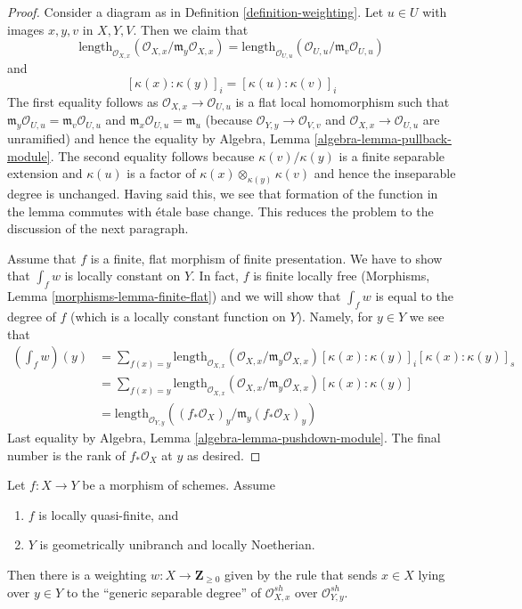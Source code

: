 \begin{proof}
Consider a diagram as in Definition \ref{definition-weighting}.
Let $u \in U$ with images $x, y, v$ in $X, Y, V$. Then we claim that
$$
\text{length}_{\mathcal{O}_{X, x}}
(\mathcal{O}_{X, x}/\mathfrak m_y \mathcal{O}_{X, x}) =
\text{length}_{\mathcal{O}_{U, u}}
(\mathcal{O}_{U, u}/\mathfrak m_v \mathcal{O}_{U, u})
$$
and
$$
[\kappa(x) : \kappa(y)]_i =
[\kappa(u) : \kappa(v)]_i
$$
The first equality follows as $\mathcal{O}_{X, x} \to \mathcal{O}_{U, u}$
is a flat local homomorphism such that
$\mathfrak m_y \mathcal{O}_{U, u} = \mathfrak m_v \mathcal{O}_{U, u}$
and $\mathfrak m_x \mathcal{O}_{U, u} = \mathfrak m_u$
(because $\mathcal{O}_{Y, y} \to \mathcal{O}_{V, v}$ and
$\mathcal{O}_{X, x} \to \mathcal{O}_{U, u}$ are unramified)
and hence the equality by Algebra, Lemma \ref{algebra-lemma-pullback-module}.
The second equality follows because $\kappa(v)/\kappa(y)$ is a finite
separable extension and $\kappa(u)$ is a factor of
$\kappa(x) \otimes_{\kappa(y)} \kappa(v)$ and hence the inseparable
degree is unchanged. Having said this, we see that formation
of the function in the lemma commutes with \'etale base change.
This reduces the problem to the discussion of the next paragraph.

\medskip\noindent
Assume that $f$ is a finite, flat morphism of finite presentation.
We have to show that $\int_f w$ is locally constant on $Y$.
In fact, $f$ is finite locally free
(Morphisms, Lemma \ref{morphisms-lemma-finite-flat})
and we will show that $\int_f w$ is equal to the degree of $f$
(which is a locally constant function on $Y$). Namely,
for $y \in Y$ we see that
\begin{align*}
(\textstyle{\int}_f w)(y)
& =
\sum\nolimits_{f(x) = y}
\text{length}_{\mathcal{O}_{X, x}}
(\mathcal{O}_{X, x}/\mathfrak m_y \mathcal{O}_{X, x})
[\kappa(x) : \kappa(y)]_i
[\kappa(x) : \kappa(y)]_s \\
& =
\sum\nolimits_{f(x) = y}
\text{length}_{\mathcal{O}_{X, x}}
(\mathcal{O}_{X, x}/\mathfrak m_y \mathcal{O}_{X, x})
[\kappa(x) : \kappa(y)] \\
& =
\text{length}_{\mathcal{O}_{Y, y}}((f_*\mathcal{O}_X)_y/
\mathfrak m_y (f_*\mathcal{O}_X)_y)
\end{align*}
Last equality by Algebra, Lemma \ref{algebra-lemma-pushdown-module}.
The final number is the rank of $f_*\mathcal{O}_X$ at $y$ as desired.
\end{proof}

\begin{lemma}
\label{lemma-weighting-quasi-finite-Noetherian}
Let $f : X \to Y$ be a morphism of schemes. Assume
\begin{enumerate}
\item $f$ is locally quasi-finite, and
\item $Y$ is geometrically unibranch and locally Noetherian.
\end{enumerate}
Then there is a weighting $w : X \to \mathbf{Z}_{\geq 0}$ given by
the rule that sends $x \in X$ lying over $y \in Y$ to the
``generic separable degree''
of $\mathcal{O}_{X, x}^{sh}$ over $\mathcal{O}_{Y, y}^{sh}$.
\end{lemma}

